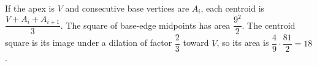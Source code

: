 If the apex is $V$ and consecutive base vertices are $A_i$, each centroid is $\dfrac{V+A_i+A_{i+1}}{3}$. The square of base-edge midpoints has area $\dfrac{9^2}{2}$. The centroid square is its image under a dilation of factor $\dfrac{2}{3}$ toward $V$, so its area is $\dfrac{4}{9}\cdot\dfrac{81}{2}=\boxed{18}$.
